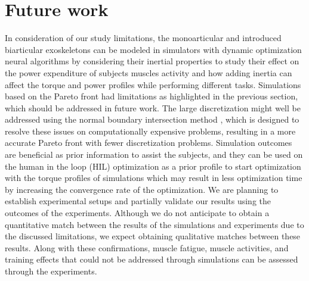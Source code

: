 \documentclass[10pt,letterpaper]{article}
\begin{document}
\section*{Future work}
In consideration of our study limitations,  the monoarticular and introduced biarticular exoskeletons can be modeled in simulators with dynamic optimization neural algorithms \cite{110,111,112,180} by considering their inertial properties to study their effect on the power expenditure of subjects muscles activity and how adding inertia can affect the torque and power profiles while performing different tasks. 
Simulations based on the Pareto front had limitations as highlighted in the previous section, which should be addressed in future work. The large discretization might well be addressed using the normal boundary intersection method \cite{108}, which is designed to resolve these issues on computationally expensive problems, resulting in a more accurate Pareto front with fewer discretization problems.
Simulation outcomes are beneficial as prior information to assist the subjects, and they can be used on the human in the loop (HIL) optimization \cite{109} as a prior profile to start optimization with the torque profiles of simulations which may result in less optimization time by increasing the convergence rate of the optimization. We are planning to establish experimental setups and partially validate our results using the outcomes of the experiments. Although we do not anticipate to obtain a quantitative match between the results of the simulations and experiments due to the discussed limitations, we expect obtaining qualitative matches between these results. Along with these confirmations, muscle fatigue, muscle activities, and training effects that could not be addressed through simulations can be assessed through the experiments.
\end{document}
